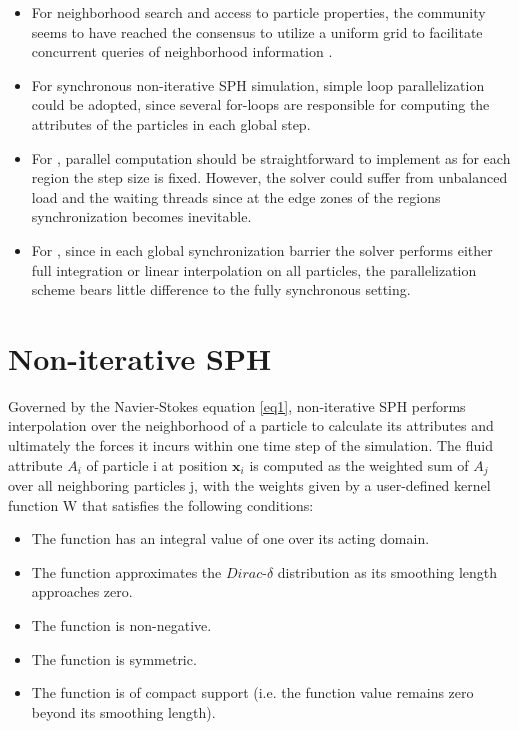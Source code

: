 \documentclass[
	11pt, 
	DIV10,
	ngerman,
	a4paper, 
	oneside, 
	headings=normal, 
	captions=tableheading,
	final, 
	numbers=noenddot
]{scrartcl}
\begin{document}
\begin{itemize}
    \item For neighborhood search and access to particle properties, the community seems to have reached the consensus to utilize a uniform grid to facilitate concurrent queries of neighborhood information \cite{ihmsen2014sph}.
    \item For synchronous non-iterative SPH simulation, simple loop parallelization could be adopted, since several for-loops are responsible for computing the attributes of the particles in each global step.
    \item For \cite{goswami2014regional}, parallel computation should be straightforward to implement as for each region the step size is fixed. However, the solver could suffer from unbalanced load and the waiting threads since at the edge zones of the regions synchronization becomes inevitable.
    \item For \cite{ban2018adaptively}, since in each global synchronization barrier the solver performs either full integration or linear interpolation on all particles, the parallelization scheme bears little difference to the fully synchronous setting.
\end{itemize}

\section{Non-iterative SPH}

Governed by the Navier-Stokes equation \eqref{eq1}, non-iterative SPH performs interpolation over the neighborhood of a particle to calculate its attributes and ultimately the forces it incurs within one time step of the simulation. The fluid attribute $ A_{i} $ of particle i at position $ \boldsymbol{x}_{i} $ is computed as the weighted sum of  $ A_{j} $ over all neighboring particles j, with the weights given by a user-defined kernel function W that satisfies the following conditions:

\begin{itemize}
    \item The function has an integral value of one over its acting domain.
    \item The function approximates the $ Dirac $-$ \delta $ distribution as its smoothing length approaches zero.
    \item The function is non-negative.
    \item The function is symmetric.
    \item The function is of compact support (i.e. the function value remains zero beyond its smoothing length).
\end{itemize}
\end{document}
